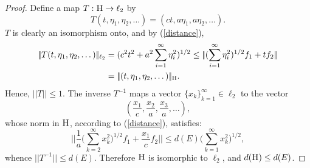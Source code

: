 \documentclass{article}[1100]
\theoremstyle{definition}
\theoremstyle{remark}
\newcommand\norma[1]{|\!|#1|\!|}
\begin{document}
\begin{proof}
Define a map $T:\textsc{H}\to\ell_2$ by
\[ T(t,\eta_1,\eta_2,\dots)=(c t,a \eta_1,a \eta_2,\dots).\]
$T$ is clearly an isomorphism onto, and by (\ref{distance}),
\[
\begin{aligned}
\norma{T(t,\eta_1,\eta_2,\dots)}_{\ell_2}&=(c^{2}t^2+a^{2}\sum_{i=1}^{\infty}\eta_i^2)^{1/2}\leq  \norma{(\sum_{i=1}^{\infty}\eta_i^2)^{1/2}f_1+tf_2}\\
&=\norma{(t,\eta_1,\eta_2,\dots)}_{\textsc{H}}. \\
\end{aligned}
\]
Hence, $\norma{T}\leq 1$. The inverse $T^{-1}$ maps a vector $\{x_k\}_{k=1}^{\infty}\in\ell_2$ to the vector
\[(\frac{x_1}{c},\frac{x_2}{a},\frac{x_3}{a},\dots), \]
whose norm in $\textsc{H}$, according to (\ref{distance}), satisfies:
\[\norma{\frac{1}{a}\bigg(\sum_{k=2}^{\infty}x_k^2\bigg)^{1/2}f_1+\frac{x_1}{c}f_2}\leq d(E)\bigg(\sum_{k=1}^{\infty}x_k^2\bigg)^{1/2},\]
whence $\norma{T^{-1}}\leq d(E)$.
Therefore $\textsc{H}$ is  isomorphic to $\ell_2$, and  $d(\textsc{H})\leq d(E)$. 

\end{proof}
\end{document}
